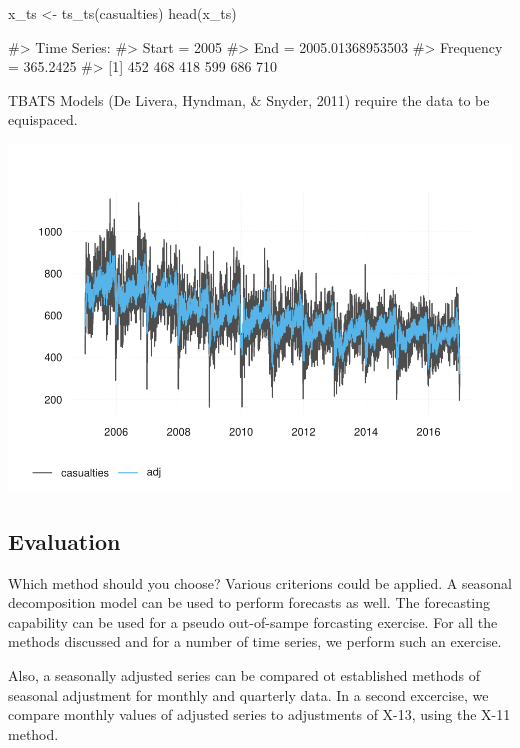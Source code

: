 \begin{Schunk}
\begin{Sinput}
x_ts <- ts_ts(casualties)
head(x_ts)
\end{Sinput}
\begin{Soutput}
#> Time Series:
#> Start = 2005 
#> End = 2005.01368953503 
#> Frequency = 365.2425 
#> [1] 452 468 418 599 686 710
\end{Soutput}
\end{Schunk}

TBATS Models (De Livera, Hyndman, \& Snyder, 2011) require the data to
be equispaced.

\begin{Schunk}

\includegraphics[width=1\linewidth]{overview_files/figure-latex/tbats-1} \end{Schunk}

\hypertarget{evaluation}{%
\subsection{Evaluation}\label{evaluation}}

Which method should you choose? Various criterions could be applied. A
seasonal decomposition model can be used to perform forecasts as well.
The forecasting capability can be used for a pseudo out-of-sampe
forcasting exercise. For all the methods discussed and for a number of
time series, we perform such an exercise.

Also, a seasonally adjusted series can be compared ot established
methods of seasonal adjustment for monthly and quarterly data. In a
second excercise, we compare monthly values of adjusted series to
adjustments of X-13, using the X-11 method.

